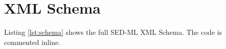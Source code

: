 \chapter{XML Schema}
Listing \ref{lst:schema} shows the full SED-ML XML Schema. The code is commented inline.
\label{sec:xmlschema}

